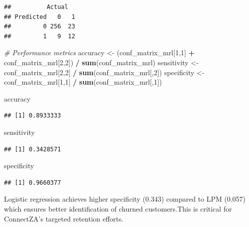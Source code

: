 \documentclass[
]{article}
\newenvironment{Shaded}{\begin{snugshade}}{\end{snugshade}}
\newcommand{\CommentTok}[1]{\textcolor[rgb]{0.56,0.35,0.01}{\textit{#1}}}
\newcommand{\DecValTok}[1]{\textcolor[rgb]{0.00,0.00,0.81}{#1}}
\newcommand{\FunctionTok}[1]{\textcolor[rgb]{0.13,0.29,0.53}{\textbf{#1}}}
\newcommand{\NormalTok}[1]{#1}
\newcommand{\OtherTok}[1]{\textcolor[rgb]{0.56,0.35,0.01}{#1}}
\newcommand{\SpecialCharTok}[1]{\textcolor[rgb]{0.81,0.36,0.00}{\textbf{#1}}}
\begin{document}
\begin{verbatim}
##          Actual
## Predicted   0   1
##         0 256  23
##         1   9  12
\end{verbatim}

\begin{Shaded}
\begin{Highlighting}[]
\CommentTok{\# Performance metrics}
\NormalTok{accuracy }\OtherTok{\textless{}{-}}\NormalTok{ (conf\_matrix\_mrl[}\DecValTok{1}\NormalTok{,}\DecValTok{1}\NormalTok{] }\SpecialCharTok{+}\NormalTok{ conf\_matrix\_mrl[}\DecValTok{2}\NormalTok{,}\DecValTok{2}\NormalTok{]) }\SpecialCharTok{/} \FunctionTok{sum}\NormalTok{(conf\_matrix\_mrl)}
\NormalTok{sensitivity }\OtherTok{\textless{}{-}}\NormalTok{ conf\_matrix\_mrl[}\DecValTok{2}\NormalTok{,}\DecValTok{2}\NormalTok{] }\SpecialCharTok{/} \FunctionTok{sum}\NormalTok{(conf\_matrix\_mrl[,}\DecValTok{2}\NormalTok{])}
\NormalTok{specificity }\OtherTok{\textless{}{-}}\NormalTok{ conf\_matrix\_mrl[}\DecValTok{1}\NormalTok{,}\DecValTok{1}\NormalTok{] }\SpecialCharTok{/} \FunctionTok{sum}\NormalTok{(conf\_matrix\_mrl[,}\DecValTok{1}\NormalTok{])}

\NormalTok{accuracy}
\end{Highlighting}
\end{Shaded}

\begin{verbatim}
## [1] 0.8933333
\end{verbatim}

\begin{Shaded}
\begin{Highlighting}[]
\NormalTok{sensitivity}
\end{Highlighting}
\end{Shaded}

\begin{verbatim}
## [1] 0.3428571
\end{verbatim}

\begin{Shaded}
\begin{Highlighting}[]
\NormalTok{specificity}
\end{Highlighting}
\end{Shaded}

\begin{verbatim}
## [1] 0.9660377
\end{verbatim}

\hfill\break
Logistic regression achieves higher specificity (0.343) compared to LPM
(0.057) which ensures better identification of churned customers.This is
critical for ConnectZA's targeted retention efforts.\\
\end{document}
